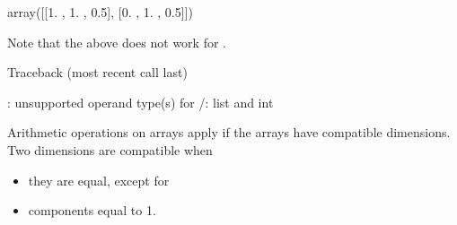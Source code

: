 \documentclass[letterpaper,10pt,english]{sphinxmanual}
\begin{document}
\begin{sphinxVerbatim}[commandchars=\\\{\}]
array([[1. , 1. , 0.5],
       [0. , 1. , 0.5]])
\end{sphinxVerbatim}

Note that the above does not work for .

\begin{sphinxVerbatim}[commandchars=\\\{\}]
   
\end{sphinxVerbatim}

\begin{sphinxVerbatim}[commandchars=\\\{\}]
Traceback (most recent call last)
  
    

: unsupported operand type(s) for /: \PYGZsq{}list\PYGZsq{} and \PYGZsq{}int\PYGZsq{}
\end{sphinxVerbatim}

Arithmetic operations on  arrays apply if the arrays have compatible dimensions. Two dimensions are compatible when
\begin{itemize}
\item {} 
they are equal, except for

\item {} 
components equal to 1.

\end{itemize}
\end{document}
